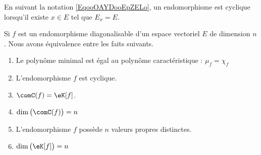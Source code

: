 En suivant la notation \eqref{EqooOAYDooEpZELo}, un endomorphisme est cyclique lorsqu'il existe \( x\in E\) tel que \( E_x=E\).

\begin{proposition}      \label{PropooQALUooTluDif}
    Si \( f\) est un endomorphisme diagonalisable d'un espace vectoriel \( E\) de dimension \( n\). Nous avons équivalence entre les faits suivants.
    \begin{enumerate}
        \item\label{ITEMooSOYYooZVibjrii}
            Le polynôme minimal est égal au polynôme caractéristique : \( \mu_f=\chi_f\)
        \item\label{ITEMooSOYYooZVibjrvi}
            L'endomorphisme \( f\) est cyclique.
        \item\label{ITEMooSOYYooZVibjrv}
            \( \comC(f)=\eK[f]\).
        \item\label{ITEMooSOYYooZVibjriv}
            \( \dim\big( \comC(f) \big)=n\)
        \item\label{ITEMooSOYYooZVibjriii}
            L'endomorphisme \( f\) possède \( n\) valeurs propres distinctes.
        \item   \label{ITEMooSOYYooZVibjri}
            \( \dim\big( \eK[f] \big)=n\)
    \end{enumerate}
\end{proposition}

